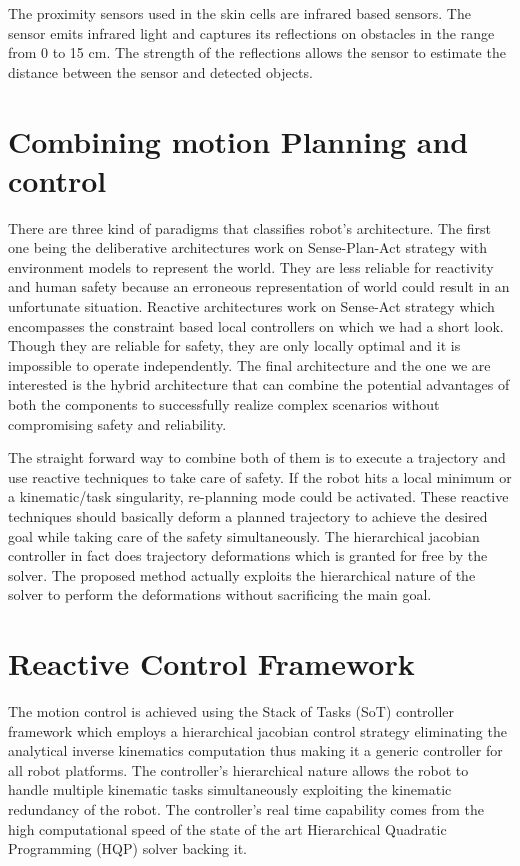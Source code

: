 The proximity sensors used in the skin cells are infrared based sensors. The sensor emits infrared light and captures its reflections on obstacles 
in the range from 0 to 15 cm. The strength of the reflections allows the sensor to estimate the distance between the sensor and detected objects.   

\section{Combining motion Planning and control}
There are three kind of paradigms that classifies robot's architecture\cite{asada1986robot}. The first one being the deliberative architectures work on Sense-Plan-Act strategy with environment models to represent the world. They are less reliable for reactivity and human safety because an erroneous representation of world could result in an unfortunate situation. Reactive architectures work on Sense-Act strategy which encompasses the constraint based local controllers on which we had a short look. Though they are reliable for safety, they are only locally optimal and it is impossible to operate independently. The final architecture and the one we are interested is the hybrid architecture that can combine the potential advantages of both the components to successfully realize complex scenarios without compromising safety and reliability. 

The straight forward way to combine both of them is to execute a trajectory and use reactive techniques to take care of safety. If the robot hits a local minimum or a kinematic/task singularity, re-planning mode could be activated. These reactive techniques should basically deform a planned trajectory to achieve the desired goal while taking care of the safety simultaneously. The hierarchical jacobian controller in fact does trajectory deformations which is granted for free by the solver\cite{escande2014hierarchical}. The proposed method actually exploits the hierarchical nature of the solver to perform the deformations without sacrificing the main goal. 

\section{Reactive Control Framework}
The motion control is achieved using the Stack of Tasks (SoT) controller
framework \cite{Mansard2009} which employs a hierarchical jacobian control strategy eliminating the analytical inverse kinematics computation thus making it a generic controller for all robot platforms. The controller's hierarchical nature allows the robot to handle multiple kinematic tasks simultaneously exploiting the kinematic redundancy of the robot. The controller's real time capability comes from the high computational speed of the state of the art Hierarchical Quadratic Programming (HQP) solver backing it. 


